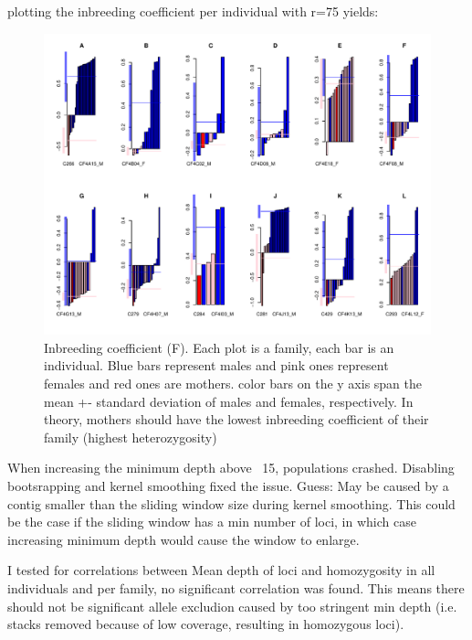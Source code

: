 \documentclass[10pt,a4paper]{report}
\begin{document}
plotting the inbreeding coefficient per individual with r=75 yields:

\begin{figure}[h]
	\begin{center}
		\hspace*{-1in}
		\includegraphics[width=1.5\textwidth]{F_d-25_r-75}
		\caption{Inbreeding coefficient (F). Each plot is a family, each bar is an individual. Blue bars represent males and pink ones represent females and red ones are mothers. color bars on the y axis span the mean +- standard deviation of males and females, respectively. In theory, mothers should have the lowest inbreeding coefficient of their family (highest heterozygosity)}
	\end{center}
\end{figure}

When increasing the minimum depth above ~15, populations crashed. Disabling bootsrapping and kernel smoothing fixed the issue. Guess: May be caused by a contig smaller than the sliding window size during kernel smoothing. This could be the case if the sliding window has a min number of loci, in which case increasing minimum depth would cause the window to enlarge.

I tested for correlations between Mean depth of loci and homozygosity in all individuals and per family, no significant correlation was found. This means there should not be significant allele excludion caused by too stringent min depth (i.e. stacks removed because of low coverage, resulting in homozygous loci).
\end{document}
